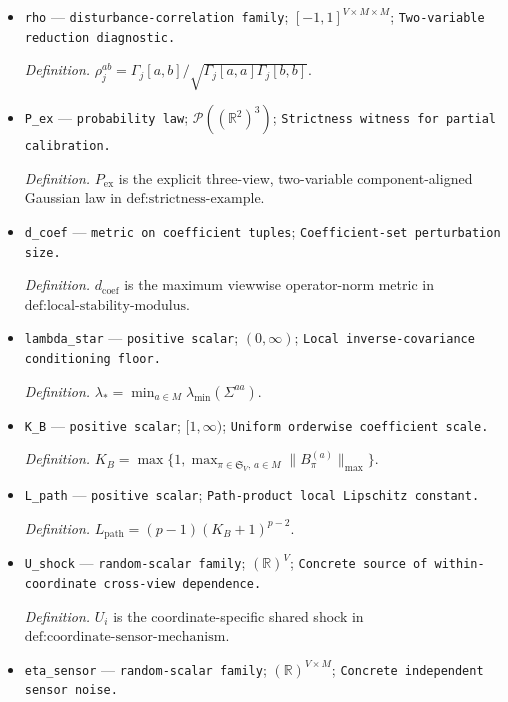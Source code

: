 \documentclass{article}
\begin{document}
\begin{itemize}
  \item \texttt{rho} --- \texttt{disturbance-\allowbreak{}correlation family}; \([-1,1]^{V\times M\times M}\); \texttt{Two-\allowbreak{}variable reduction diagnostic.}
  \par\smallskip\noindent\emph{Definition.} \(\rho_j^{ab}=\Gamma_j[a,b]/\sqrt{\Gamma_j[a,a]\Gamma_j[b,b]}\).
  \item \texttt{P\_\allowbreak{}ex} --- \texttt{probability law}; \(\mathcal P((\mathbb R^2)^3)\); \texttt{Strictness witness for partial calibration.}
  \par\smallskip\noindent\emph{Definition.} \(P_{\mathrm{ex}}\) is the explicit three-view, two-variable component-aligned Gaussian law in \(\text{def:strictness-example}\).
  \item \texttt{d\_\allowbreak{}coef} --- \texttt{metric on coefficient tuples}; \texttt{Coefficient-\allowbreak{}set perturbation size.}
  \par\smallskip\noindent\emph{Definition.} \(d_{\mathrm{coef}}\) is the maximum viewwise operator-norm metric in \(\text{def:local-stability-modulus}\).
  \item \texttt{lambda\_\allowbreak{}star} --- \texttt{positive scalar}; \((0,\infty)\); \texttt{Local inverse-\allowbreak{}covariance conditioning floor.}
  \par\smallskip\noindent\emph{Definition.} \(\lambda_*=\min_{a\in M}\lambda_{\min}(\Sigma^{aa})\).
  \item \texttt{K\_\allowbreak{}B} --- \texttt{positive scalar}; \([1,\infty)\); \texttt{Uniform orderwise coefficient scale.}
  \par\smallskip\noindent\emph{Definition.} \(K_B=\max\{1,\max_{\pi\in\mathfrak S_V,\,a\in M}\|B_\pi^{(a)}\|_{\max}\}\).
  \item \texttt{L\_\allowbreak{}path} --- \texttt{positive scalar}; \texttt{Path-\allowbreak{}product local Lipschitz constant.}
  \par\smallskip\noindent\emph{Definition.} \(L_{\mathrm{path}}=(p-1)(K_B+1)^{p-2}\).
  \item \texttt{U\_\allowbreak{}shock} --- \texttt{random-\allowbreak{}scalar family}; \((\mathbb R)^V\); \texttt{Concrete source of within-\allowbreak{}coordinate cross-\allowbreak{}view dependence.}
  \par\smallskip\noindent\emph{Definition.} \(U_i\) is the coordinate-specific shared shock in \(\text{def:coordinate-sensor-mechanism}\).
  \item \texttt{eta\_\allowbreak{}sensor} --- \texttt{random-\allowbreak{}scalar family}; \((\mathbb R)^{V\times M}\); \texttt{Concrete independent sensor noise.}

\end{itemize}
\end{document}
